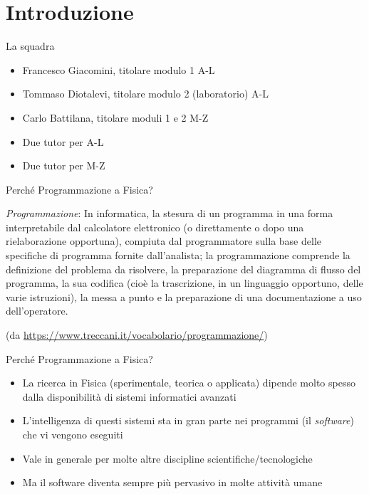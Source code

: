 
\section*{Introduzione}

\begin{frame}{La squadra}

  \begin{itemize}
  \item Francesco Giacomini, titolare modulo 1 A-L
  \item Tommaso Diotalevi, titolare modulo 2 (laboratorio) A-L
  \item Carlo Battilana, titolare moduli 1 e 2 M-Z
  \item Due tutor per A-L
  \item Due tutor per M-Z
  \end{itemize}

\end{frame}

\begin{frame}{Perché Programmazione a Fisica?}

  \textit{Programmazione}: In informatica, la stesura di un programma in una
  forma interpretabile dal calcolatore elettronico (o direttamente o dopo una
  rielaborazione opportuna), compiuta dal programmatore sulla base delle
  specifiche di programma fornite dall'analista; la programmazione comprende la
  definizione del problema da risolvere, la preparazione del diagramma di flusso
  del programma, la sua codifica (cioè la trascrizione, in un linguaggio
  opportuno, delle varie istruzioni), la messa a punto e la preparazione di una
  documentazione a uso dell'operatore.

  {\tiny (da \url{https://www.treccani.it/vocabolario/programmazione/})}

\end{frame}

\begin{frame}{Perché Programmazione a Fisica? \insertcontinuationtext}

  \begin{itemize}[<+->]
  \item La ricerca in Fisica (sperimentale, teorica o applicata) dipende
    molto spesso dalla disponibilità di sistemi informatici avanzati
  \item L'intelligenza di questi sistemi sta in gran parte nei programmi (il
    \textit{software}) che vi vengono eseguiti
  \item Vale in generale per molte altre discipline scientifiche/tecnologiche
  \item Ma il software diventa sempre più pervasivo in molte attività umane
  \end{itemize}

\end{frame}

